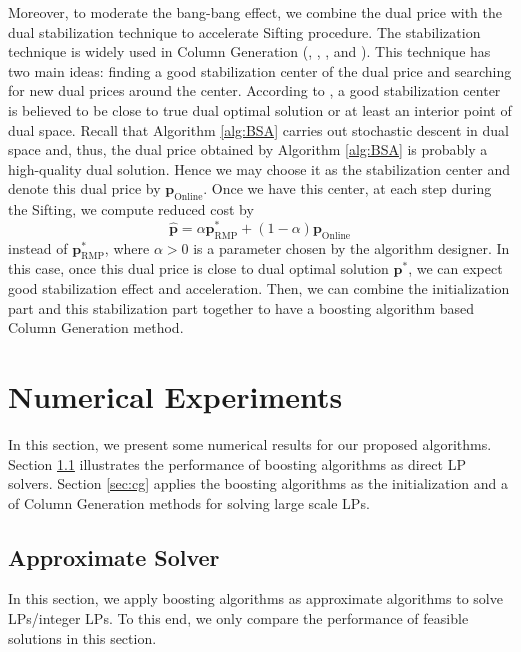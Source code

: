 \documentclass{article} %
\begin{document}
Moreover, to moderate the bang-bang effect, we combine the dual price with the dual stabilization technique to accelerate Sifting procedure. The stabilization technique is widely used in Column Generation (\cite{du1999stabilized}, \cite{amor2004stabilization}, \cite{lubbecke2005selected}, and \cite{2011Chebyshev}). This technique has two main ideas: finding a good stabilization center of the dual price and searching for new dual prices around the center. According to \cite{lubbecke2010column}, a good stabilization center is believed to be close to true dual optimal solution or at least an interior point of dual space. Recall that Algorithm \ref{alg:BSA} carries out stochastic descent in dual space and, thus, the dual price obtained by Algorithm \ref{alg:BSA} is probably a high-quality dual solution. Hence we may choose it as the stabilization center and denote this dual price by $\bm{p}_{\text{Online}}$. Once we have this center, at each step during the Sifting, we compute reduced cost by
$$
    \hat{\bm{p}} = \alpha \bm{p}^*_{\text{RMP}} + (1-\alpha) \bm{p}_{\text{Online}}
$$
instead of $\bm{p}^*_{\text{RMP}}$, where $\alpha>0$ is a parameter chosen by the algorithm designer. In this case, once this dual price is close to dual optimal solution $\bm{p}^*$, we can expect good stabilization effect and acceleration. Then, we can combine the initialization part and this stabilization part together to have a boosting algorithm based Column Generation method.






\section{Numerical Experiments}
\label{sec:exp}
In this section, we present some numerical results for our proposed algorithms. Section \ref{sec:solver} illustrates the performance of boosting algorithms as direct LP solvers. Section \ref{sec:cg} applies the boosting algorithms as the initialization and a  of Column Generation methods for solving large scale LPs.


\subsection{Approximate Solver}
\label{sec:solver}
In this section, we apply boosting algorithms as approximate algorithms to solve LPs/integer LPs. To this end, we only compare the performance of feasible solutions in this section.  
\end{document}
